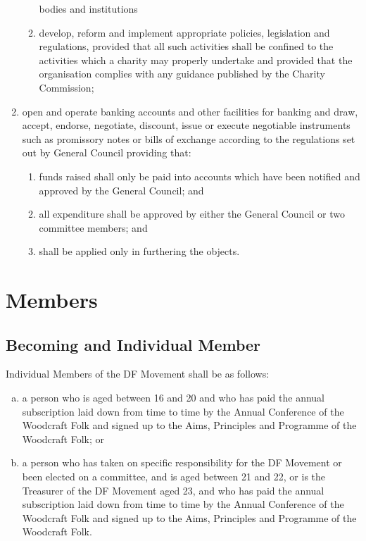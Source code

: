 \documentclass[a4paper, 12pt]{report}
\begin{document}
\begin{enumerate}
\begin{enumerate}
bodies and institutions
\item develop, reform and implement appropriate policies, legislation and regulations, provided that all such activities shall be confined to the activities which a charity may properly undertake and provided that the organisation complies with any guidance published by the Charity Commission;
\end{enumerate}
\item open and operate banking accounts and other facilities for banking and draw,
accept, endorse, negotiate, discount, issue or execute negotiable instruments such
as promissory notes or bills of exchange according to the regulations set out by
General Council providing that:
\begin{enumerate}
\item funds raised shall only be paid into accounts which have been notified and
approved by the General Council; and
\item all expenditure shall be approved by either the General Council or two committee
members; and
\item shall be applied only in furthering the objects.
\end{enumerate}
\end{enumerate}

\section{Members}
\label{sec:members}
\subsection{Becoming and Individual Member}
\label{sec:indivmembers}
Individual Members of the DF Movement shall be as follows:
\begin{enumerate}[(a)]
\item \label{item:normalmember} a person who is aged between 16 and 20 and who has paid the annual subscription laid down from time to time by the Annual Conference of the Woodcraft Folk and signed up to the Aims, Principles and Programme of the Woodcraft Folk; or
\item  \label{item:greyarea} a person who has taken on specific responsibility for the DF Movement or been elected on a committee, and is aged between 21 and 22, or is the Treasurer of the DF Movement aged 23, and who has paid the annual subscription laid down from time to time by the Annual Conference of the Woodcraft Folk and signed up to the Aims, Principles and Programme of the Woodcraft Folk.
\end{enumerate}
\end{document}

